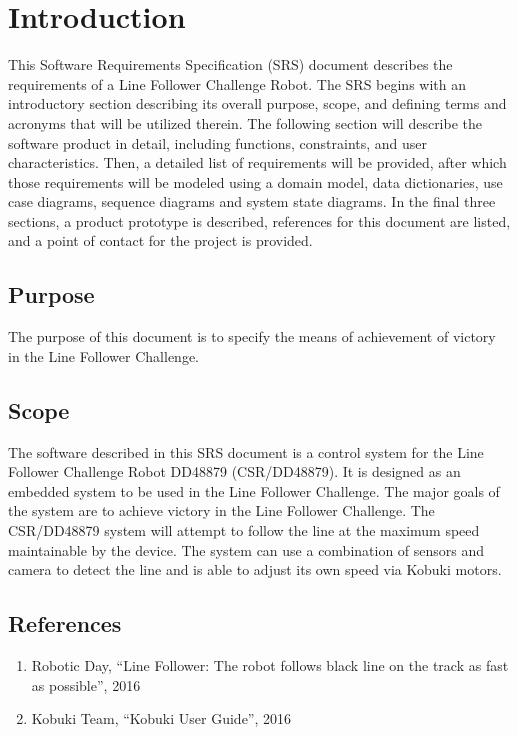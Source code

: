 \chapter{Introduction}
\label{ch:intro}

This Software Requirements Specification (SRS) document describes the requirements of a
Line Follower Challenge Robot. The SRS begins with an introductory section
describing its overall purpose, scope, and defining terms and acronyms that will be utilized
therein. The following section will describe the software product in detail, including functions,
constraints, and user characteristics. Then, a detailed list of requirements will be provided, after
which those requirements will be modeled using a domain model, data dictionaries, use case
diagrams, sequence diagrams and system state diagrams. In the final three sections, a product
prototype is described, references for this document are listed, and a point of contact for the
project is provided.

\section{Purpose}

The purpose of this document is to specify the means of achievement of victory in the Line Follower Challenge.

\section{Scope}

The software described in this SRS document is a control system for the Line Follower Challenge Robot DD48879 (CSR/DD48879). It is designed as an embedded system to be used in the Line Follower Challenge.
The major goals of the system are to achieve victory in the Line Follower Challenge.
The CSR/DD48879 system will attempt to follow the line at the maximum speed maintainable by the device. The system can use a combination of sensors and camera to detect the line and is able to adjust its own speed via Kobuki motors.

\section{References}

\begin{enumerate}
    \item \label{rules} Robotic Day, ``Line Follower: The robot follows black line on the track as fast as possible'', 2016
    \item \label{guide} Kobuki Team, ``Kobuki User Guide'', 2016
\end{enumerate}


